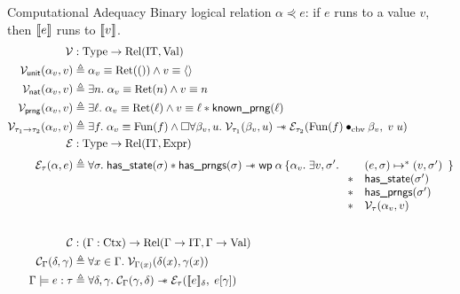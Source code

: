 \documentclass[8pt]{beamer}
\newcommand{\redu}{\mapsto}
\newcommand{\hasstate}{\textsf{has\_state}}
\newcommand{\IT}{\mathrm{IT}}
\newcommand{\gRet}{\mathrm{Ret}}
\newcommand{\gFun}{\mathrm{Fun}}
\newcommand{\cbvap}{\bullet_{\text{cbv}}}
\newcommand{\knownprng}{\textsf{known\_prng}}
\newcommand{\hasprngs}{\textsf{has\_prngs}}
\begin{document}
  \begin{frame}[allowframebreaks]{Computational Adequacy}
     Binary logical relation \(\alpha \curlyeqprec e\): if \(e\) runs to a value \(v\), then \(\llbracket {e} \rrbracket\) runs to \(\llbracket {v} \rrbracket\).
     \begin{align*}
       \mathcal{V} & : \iType \to \mathrm{Rel}(\IT,\iVal) \\
       \mathcal{V}_{\tunit}(\alpha_v,v) &\eqdef \alpha_v \equiv \gRet(()) \land v \equiv \vunit \\
       \mathcal{V}_{\tnat}(\alpha_v,v)  &\eqdef \exists n.\; \alpha_v \equiv \gRet(n) \land v \equiv n \\
       \mathcal{V}_{\syn{prng}}(\alpha_v,v) &\eqdef \exists \loc.\;
       \alpha_v \equiv \gRet(\loc) \land v \equiv \loc \star \knownprng(\loc) \\
       \mathcal{V}_{\type_1 \to \type_2}(\alpha_v,v) &\eqdef \exists f.\;
       \alpha_v \equiv \gFun(f) \land
       \Box\forall \beta_v,u.\; \mathcal{V}_{\type_1}(\beta_v,u) \wand
       \mathcal{E}_{\type_2}(\gFun(f)\cbvap \beta_v,\; \eapp{v}{u})\\
       \mathcal{E} & : \iType \to \mathrm{Rel}(\IT,\iExpr) \\[0.6ex]
       \mathcal{E}_{\type}(\alpha,e) &\eqdef \forall \sigma.\;
       \hasstate(\sigma) \star \hasprngs(\sigma) \wand
       \wpre{\alpha}{\alpha_v.\; \exists v,\sigma'.\;
         \begin{array}[t]{ll}
        &(e,\sigma) \redu^\ast (v,\sigma')\\
           \star & \hasstate(\sigma')\\
           \star & \hasprngs(\sigma')\\
           \star & \mathcal{V}_{\type}(\alpha_v,v)
       \end{array}} \\[4ex]
       \mathcal{C} &: (\Gamma : \mathrm{Ctx}) \to \mathrm{Rel}(\Gamma\to \IT, \Gamma \to \iVal) \\
       \mathcal{C}_{\Gamma}(\senv,\env) &\eqdef \forall x\in\Gamma.\; \mathcal{V}_{\Gamma(x)}(\senv(x),\env(x)) \\
       \typedSem{\Gamma}{e}{\type} & \eqdef
       \forall \senv,\env.\;
       \mathcal{C}_{\Gamma}(\env,\senv) \wand
       \mathcal{E}_{\type}(\sem{e}_\senv,\; e[\env])
     \end{align*}
   \end{frame}
\end{document}
